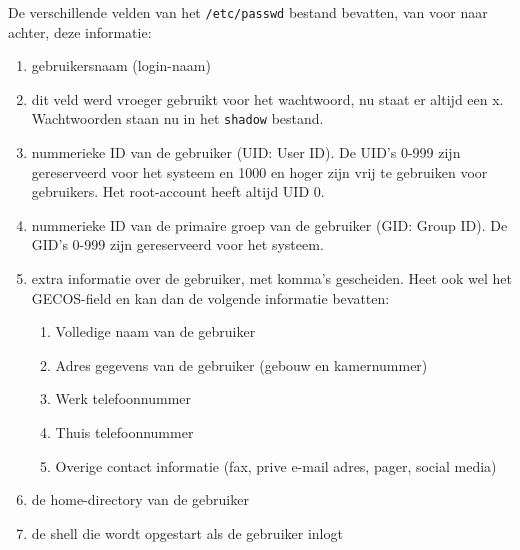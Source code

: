 De verschillende velden van het \texttt{/etc/passwd} bestand bevatten, van voor naar achter, deze informatie:
\begin{enumerate}
	\item gebruikersnaam (login-naam)
	\item dit veld werd vroeger gebruikt voor het wachtwoord, nu staat er altijd een x. Wachtwoorden staan nu in het \texttt{shadow} bestand.
	\item nummerieke ID van de gebruiker (UID: User ID). De UID's 0-999 zijn gereserveerd voor het systeem en 1000 en hoger zijn vrij te gebruiken voor gebruikers. Het root-account heeft altijd UID 0.
	\item nummerieke ID van de primaire groep van de gebruiker (GID: Group ID). De GID's 0-999 zijn gereserveerd voor het systeem.
	\item extra informatie over de gebruiker, met komma's gescheiden. Heet ook wel het GECOS-field en kan dan de volgende informatie bevatten:
		\begin{enumerate}
			\item Volledige naam van de gebruiker
			\item Adres gegevens van de gebruiker (gebouw en kamernummer)
			\item Werk telefoonnummer
			\item Thuis telefoonnummer
			\item Overige contact informatie (fax, prive e-mail adres, pager, social media)
		\end{enumerate}
	\item de home-directory van de gebruiker
	\item de shell die wordt opgestart als de gebruiker inlogt
\end{enumerate}

